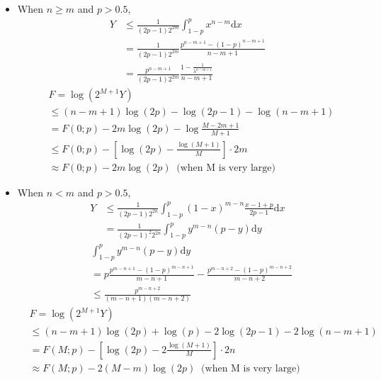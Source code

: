 \documentclass{article}
\begin{document}
\begin{itemize}
\item When $n\geq m$ and $p> 0.5$,
\begin{equation}
\begin{split}
Y &\leq  \frac{1}{(2p-1) 2^{2m}}\int_{1-p}^{p}x^{n-m}\mathrm{d}x\\
&= \frac{1}{(2p-1) 2^{2m}}\frac{p^{n-m+1}-(1-p)^{n-m+1}}{n-m+1}\\
&= \frac{p^{n-m+1}}{(2p-1) 2^{2m}}\frac{1-\frac{1}{\lambda^{n-m+1}}}{n-m+1}
\end{split}
\end{equation}
\begin{equation}
\begin{split}
&F=\log(2^{M+1}Y) \\&\leq  (n-m+1)\log(2p)-\log(2p-1)-\log(n-m+1)\\
&=F(0;p)-2m\log(2p)-\log\frac{M-2m+1}{M+1}\\
&\leq F(0;p)-\left[\log(2p)-\frac{\log(M+1)}{M}\right]\cdot 2m\\
&\approx F(0;p)-2m\log(2p)\;\;\text{(when M is very large)}
\end{split}
\end{equation}
\item When $n<m$ and $p>0.5$,
\begin{equation}
\begin{split}
Y &\leq  \frac{1}{(2p-1) 2^{2n}}\int_{1-p}^{p}(1-x)^{m-n}\frac{x-1+p}{2p-1}\mathrm{d}x\\
&= \frac{1}{(2p-1)^2 2^{2n}}\int_{1-p}^{p}y^{m-n}(p-y)\mathrm{d}y
\end{split}
\end{equation}
\begin{equation}
\begin{split}
&\int_{1-p}^{p}y^{m-n}(p-y)\mathrm{d}y\\
&=p\frac{p^{m-n+1}-(1-p)^{m-n+1}}{m-n+1}-\frac{p^{m-n+2}-(1-p)^{m-n+2}}{m-n+2}\\
&\leq \frac{p^{m-n+2}}{(m-n+1)(m-n+2)}
\end{split}
\end{equation}
\begin{equation}
\begin{split}
&F=\log(2^{M+1}Y) \\&\leq  (n-m+1)\log(2p)+\log(p)-2\log(2p-1)-2\log(n-m+1)\\
&=F(M;p)-\left[\log(2p)-2\frac{\log(M+1)}{M}\right]\cdot 2n\\
&\approx F(M;p)-2(M-m)\log(2p)\;\;\text{(when M is very large)}
\end{split}
\end{equation}
\end{itemize}
\end{document}
